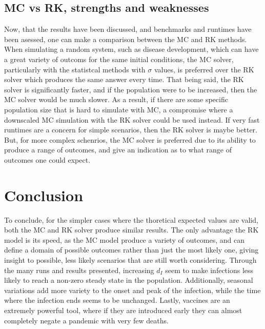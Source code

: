 \subsection{MC vs RK, strengths and weaknesses}
Now, that the results have been discussed, and benchmarks and runtimes have been asessed, one can make a comparison between the MC and RK methods. 
When simulating a random system, such as disease development, which can have a great variety of outcoms for the same initial conditions, the MC solver, particularly with the statistcal methods with $\sigma$ values, is preferred over the RK solver which produces the same answer every time.
That being said, the RK solver is significantly faster, and if the population were to be increased, then the MC solver would be much slower.
As a result, if there are some specific population size that is hard to simulate with MC, a compromise where a downscaled MC simulation with the RK solver could be used instead.
If very fast runtimes are a concern for simple scenarios, then the RK solver is maybe better.
But, for more complex schenrios, the MC solver is preferred due to its ability to produce a range of outcomes, and give an indication as to what range of outcomes one could expect.


\section{Conclusion}
To conclude, for the simpler cases where the thoretical expected values are valid, both the MC and RK solver 
produce similar results.
The only advantage the RK model is its speed, as the MC model produce a variety of outcomes, and can define a domain of possible outcomes rather than just the most likely one, giving insight to possible, less likely scenarios that are still worth considering.
Through the many runs and results presented, increasing $d_I$ seem to make infections less likely to reach a non-zero steady state in the population. Additionally, seasonal variations add more variety to the onset and peak of the infection, while the time where the infection ends seems to be unchanged.
Lastly, vaccines are an extremely powerful tool, where if they are introduced early they can almost completely negate a pandemic with very few deaths.
